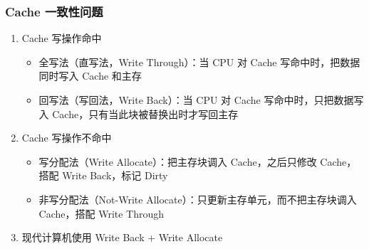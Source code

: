 \documentclass[./computer-organization-and-architecture.tex]{subfiles}
\begin{document}
    \subsubsection{Cache 一致性问题}

    \begin{enumerate}
        \item Cache 写操作命中
        \begin{itemize}
            \item 全写法（直写法，Write Through）：当 CPU 对 Cache 写命中时，把数据同时写入 Cache 和主存
            \item 回写法（写回法，Write Back）：当 CPU 对 Cache 写命中时，只把数据写入 Cache，只有当此块被替换出时才写回主存
        \end{itemize}
        \item Cache 写操作不命中
        \begin{itemize}
            \item 写分配法（Write Allocate）：把主存块调入 Cache，之后只修改 Cache，搭配 Write Back，标记 Dirty
            \item 非写分配法（Not-Write Allocate）：只更新主存单元，而不把主存块调入 Cache，搭配 Write Through
        \end{itemize}
        \item 现代计算机使用 Write Back + Write Allocate
    \end{enumerate}
\end{document}
